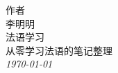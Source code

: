 \begin{titlepage}
  \raggedleft
      {\Large 作者\\ 李明明\\[1in] }
  {\Huge\scshape 法语学习\\[.2in]}
  {\large 从零学习法语的笔记整理 \\}
  \vfill
  {\itshape \today{}}
\end{titlepage}

